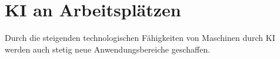 \chapter{KI an Arbeitsplätzen}
\label{chap:ai-workingplaces}

Durch die steigenden technologischen Fähigkeiten von Maschinen durch KI werden auch stetig neue Anwendungsbereiche geschaffen.
